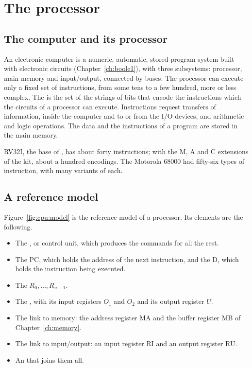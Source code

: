\section{The processor}

\subsection{The computer and its processor}

An electronic computer is a numeric, automatic, stored-program system built
with electronic circuits (Chapter~\ref{ch:boole1}), with three subsystems:
processor, main memory and input/output, connected by buses. The processor
can execute only a fixed set of instructions, from some tens to a few hundred,
more or less complex. The  is the set of the strings
of bits that encode the instructions which the circuits of a processor can
execute. Instructions request transfers of information, inside the computer
and to or from the I/O devices, and arithmetic and logic operations. The data
and the instructions of a program are stored in the main memory.

RV32I, the base of \riscv, has about forty instructions; with the M, A and C
extensions of the kit, about a hundred encodings. The Motorola 68000 had
fifty-six types of instruction, with many variants of each.

\subsection{A reference model}

Figure~\ref{fig:cpu:model} is the reference model of a processor. Its
elements are the following.

\begin{itemize}
\item The , or control unit, which produces the commands
  for all the rest.
\item The  PC, which holds the address of the next
  instruction, and the  D, which holds the instruction
  being executed.
\item The  $R_0,\dots,R_{n-1}$.
\item The , with its input registers $O_1$ and $O_2$ and its output
  register $U$.
\item The link to memory: the address register MA and the buffer register MB
  of Chapter~\ref{ch:memory}.
\item The link to input/output: an input register RI and an output register RU.
\item An  that joins them all.
\end{itemize}

